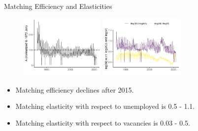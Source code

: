 \documentclass[aspectratio=169]{beamer}
\begin{document}
\begin{frame}{Matching Efficiency and Elasticities}
    \begin{figure}[!ht]
  \begin{center}
  \includegraphics[width = 0.37\textwidth]
  {figuretable/matching_efficiency_month_aggregate.png}
  \includegraphics[width = 0.37\textwidth]
  {figuretable/elasticity_month_aggregate.png}
  \end{center}
  \footnotesize
\end{figure} 
\begin{itemize}
    \item Matching efficiency declines after 2015.
    \item Matching elasticity with respect to unemployed is 0.5 - 1.1.
    \item Matching elasticity with respect to vacancies is 0.03 - 0.5.
\end{itemize}
\end{frame}
\end{document}
